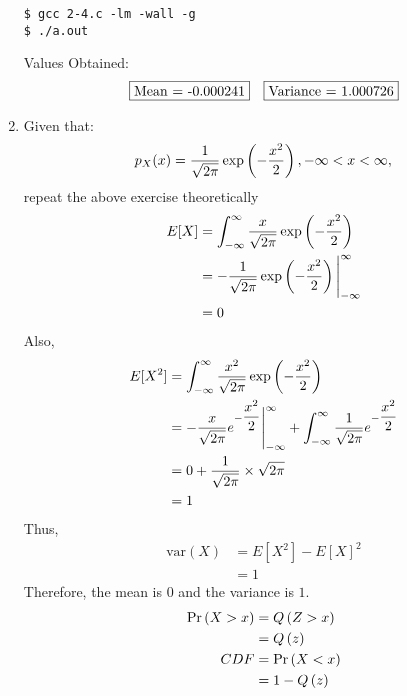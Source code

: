 \documentclass[journal,12pt,twocolumn]{IEEEtran}
\renewcommand\thesection{\arabic{section}}
\begin{document}
\begin{enumerate}[label=\thesection.\arabic*.,ref=\thesection.\theenumi]
\begin{lstlisting}
$ gcc 2-4.c -lm -wall -g
$ ./a.out
\end{lstlisting}
          Values Obtained:
          \begin{align}
               & \fbox{Mean =  -0.000241}
               & \fbox{Variance = 1.000726}
          \end{align}
    \item Given that:
          \begin{align}
              p_{X}(x) = \dfrac{1}{\sqrt{2\pi}}\exp\left(-\dfrac{x^2}{2}\right), -\infty < x < \infty,
          \end{align}
          repeat the above exercise theoretically
          \\
          \solution
          \begin{align}
              E[X] & =  \int_{-\infty}^{\infty} \dfrac{x}{\sqrt{2\pi}}\exp{\left(-\dfrac{x^2}{2}\right)}
              \\
                   & = -\dfrac{1}{\sqrt{2\pi}}\exp\left(-\dfrac{x^2}{2}\right) \Bigg{|}_{-\infty}^{\infty}
              \\
                   & = 0
          \end{align}
          Also,
          \begin{align}
              E[X^2] & =  \int_{-\infty}^{\infty} \dfrac{x^2}{\sqrt{2\pi}}\exp{\left(-\dfrac{x^2}{2}\right)}
              \\
                     & = -\dfrac{x}{\sqrt{2\pi}}e^{-\dfrac{x^2}{2}} \Bigg{|}_{-\infty}^{\infty} + \int_{-\infty}^{\infty} \dfrac{1}{\sqrt{2\pi}}e^{-\dfrac{x^2}{2}}
              \\
                     & = 0 + \dfrac{1}{\sqrt{2\pi}} \times \sqrt{2\pi}
              \\
                     & = 1
          \end{align}
          Thus,
          \begin{align}
              \text{var}(X) & = E[X^2] - E[X]^2 \\
                            & = 1
          \end{align}
          Therefore, the mean is $0$ and the variance is $1$.
          \begin{align}
              \Pr\left(X > x\right) & = Q\left(Z > x\right)
              \\
                         & = Q\left(z\right)
              \\
              CDF        & = \Pr\left(X < x\right)
              \\
                         & = 1 - Q\left(z\right)
          \end{align}
\end{enumerate}
\end{document}
